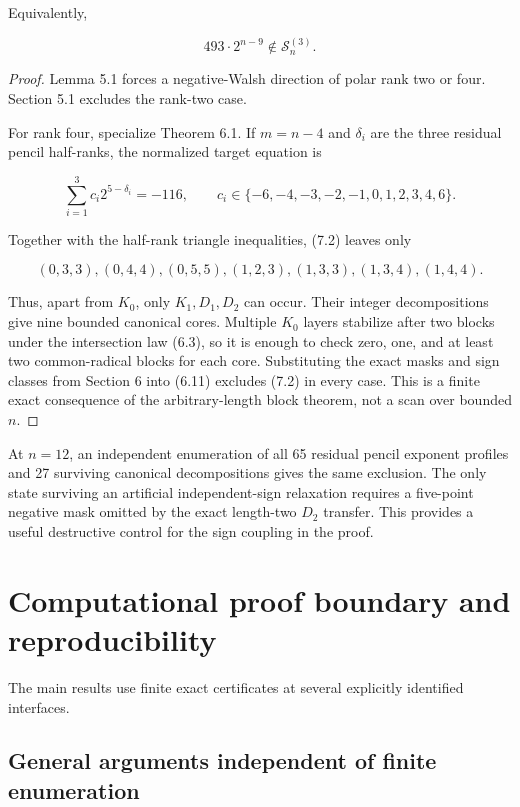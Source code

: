 \documentclass[11pt]{article}
\theoremstyle{remark}
\numberwithin{equation}{section}
\begin{document}
Equivalently,

\[
493\cdot2^{n-9}\notin\mathcal S_n^{(3)}.         \tag{7.1}
\]

\begin{proof}
Lemma 5.1 forces a negative-Walsh direction of polar rank two or four.
Section 5.1 excludes the rank-two case.

For rank four, specialize Theorem 6.1. If \(m=n-4\) and
\(\delta_i\) are the three residual pencil half-ranks, the normalized target
equation is

\[
\sum_{i=1}^3 c_i2^{5-\delta_i}=-116,
\qquad
c_i\in\{-6,-4,-3,-2,-1,0,1,2,3,4,6\}.          \tag{7.2}
\]

Together with the half-rank triangle inequalities, (7.2) leaves only

\[
(0,3,3),(0,4,4),(0,5,5),(1,2,3),
(1,3,3),(1,3,4),(1,4,4).                        \tag{7.3}
\]

Thus, apart from \(K_0\), only \(K_1,D_1,D_2\) can occur. Their integer
decompositions give nine bounded canonical cores. Multiple \(K_0\) layers
stabilize after two blocks under the intersection law (6.3), so it is enough to
check zero, one, and at least two common-radical blocks for each core. Substituting
the exact masks and sign classes from Section 6 into (6.11) excludes (7.2) in
every case. This is a finite exact consequence of the arbitrary-length block
theorem, not a scan over bounded \(n\).
\end{proof}


At \(n=12\), an independent enumeration of all 65 residual pencil exponent
profiles and 27 surviving canonical decompositions gives the same exclusion.
The only state surviving an artificial independent-sign relaxation requires a
five-point negative mask omitted by the exact length-two \(D_2\) transfer. This
provides a useful destructive control for the sign coupling in the proof.

\section{Computational proof boundary and reproducibility}


The main results use finite exact certificates at several explicitly identified
interfaces.

\subsection{General arguments independent of finite enumeration}
\end{document}
